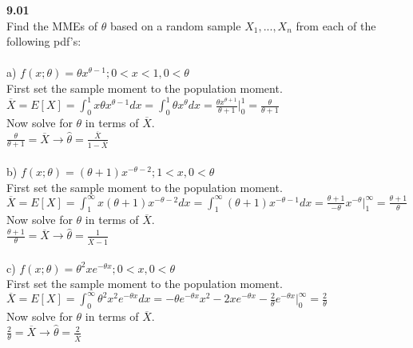 
{\bf 9.01}\\Find the MMEs of $\theta$ based on a random sample $X_1,...,X_n$ from each of the following pdf's:
\\\\a) $f(x;\theta )=\theta x^{\theta -1};0<x<1,0<\theta$
\\First set the sample moment to the population moment.
\\$\overline{X}=E[X]=\int_0^1 x\theta x^{\theta -1} dx=\int_0^1 \theta x^{\theta} dx=\frac{\theta x^{\theta +1}}{\theta +1}\Big|_0^1=\frac{\theta}{\theta +1}$
\\Now solve for $\theta$ in terms of $\overline{X}$.
\\$\frac{\theta}{\theta +1}=\overline{X}\longrightarrow \hat{\theta}=\frac{\overline{X}}{1-\overline{X}}$
\\\\b) $f(x;\theta)=(\theta +1)x^{-\theta -2};1<x,0<\theta$
\\First set the sample moment to the population moment.
\\$\overline{X}=E[X]=\int_1^\infty x(\theta +1)x^{-\theta -2} dx=\int_1^\infty (\theta +1)x^{-\theta -1}dx=\frac{\theta +1}{-\theta}x^{-\theta}\Big|_1^\infty=\frac{\theta +1}{\theta}$
\\Now solve for $\theta$ in terms of $\overline{X}$.
\\$\frac{\theta +1}{\theta}=\overline{X} \longrightarrow \hat{\theta}=\frac{1}{\overline{X}-1}$
\\\\c) $f(x;\theta)=\theta^2xe^{-\theta x};0<x,0<\theta$
\\First set the sample moment to the population moment.
\\$\overline{X}=E[X]=\int_0^\infty \theta^2x^2e^{-\theta x}dx=-\theta e^{-\theta x}x^2-2xe^{-\theta x}-\frac{2}{\theta}e^{-\theta x}\big|_0^\infty =\frac{2}{\theta}$
\\Now solve for $\theta$ in terms of $\overline{X}$.
\\$\frac{2}{\theta}=\overline{X}\longrightarrow \hat{\theta}=\frac{2}{\overline{X}}$  \\


